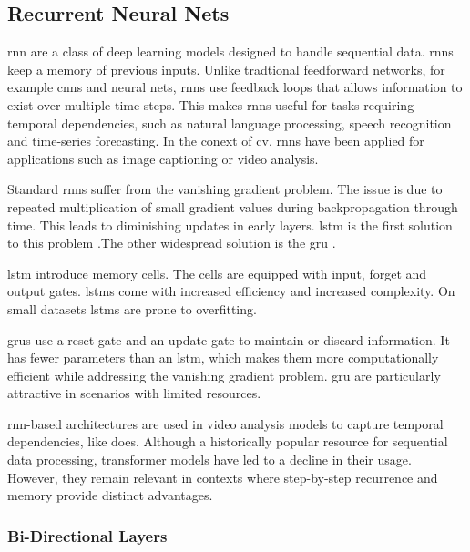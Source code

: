 \subsection{Recurrent Neural Nets}

\acrfull{rnn} are a class of deep learning models designed to handle sequential data. \acrshort{rnn}s keep a memory of previous inputs. Unlike tradtional feedforward networks, for example \acrshort{cnn}s and neural nets, \acrshort{rnn}s use feedback loops that allows information to exist over multiple time steps. This makes \acrshort{rnn}s useful for tasks requiring temporal dependencies, such as natural language processing, speech recognition and time-series forecasting\cite{ibm_rnn_2025}. In the conext of \acrfull{cv}, \acrshort{rnn}s have been applied for applications such as image captioning or video analysis. 

Standard \acrshort{rnn}s suffer from the vanishing gradient problem. The issue is due to repeated multiplication of small gradient values during backpropagation through time. This leads to diminishing updates in early layers. \acrfull{lstm} is the first solution to this problem \cite{bhogal_human_2023, kumar_human_2023, mahaseni_spotting_2021}.The other widespread solution is the \acrfull{gru} \cite{giveki_human_2024,li_oarnet_2024,yu_i3d_2023}. 

\acrshort{lstm} introduce memory cells. The cells are equipped with input, forget and output gates. \acrshort{lstm}s come with increased efficiency and increased complexity. On small datasets \acrshort{lstm}s are prone to overfitting. 


\acrlong{gru}s use a reset gate and an update gate to maintain or discard information. It has fewer parameters than an \acrshort{lstm}, which makes them more computationally efficient while addressing the vanishing gradient problem. \acrshort{gru} are particularly attractive in scenarios with limited resources. 

\acrshort{rnn}-based architectures are used in video analysis models to capture temporal dependencies, like \textcite{bhogal_human_2023} does. Although a historically popular resource for sequential data processing, transformer models have led to a decline in their usage. However, they remain relevant in contexts where step-by-step recurrence and memory provide distinct advantages\cite{ibm_rnn_2025}.

\subsubsection{Bi-Directional Layers}
\label{ssec:bi_directional_layers}

